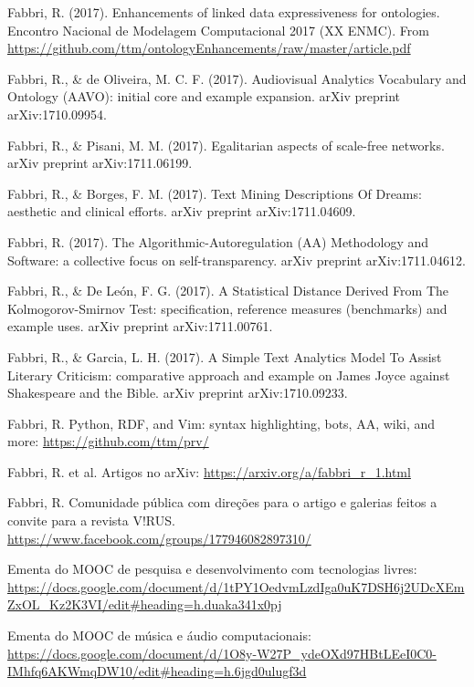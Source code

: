 \documentclass[a4paper, 11pt]{article}
\begin{document}
\begin{thebibliography}{99}
\fontsize{11}{0}\selectfont
{}
	Fabbri, R. (2017). Enhancements of linked data expressiveness for ontologies.
		Encontro Nacional de Modelagem Computacional 2017 (XX ENMC).
		From \url{https://github.com/ttm/ontologyEnhancements/raw/master/article.pdf}

	Fabbri, R., \& de Oliveira, M. C. F. (2017). Audiovisual Analytics Vocabulary and Ontology (AAVO): initial core and example expansion. arXiv preprint arXiv:1710.09954.

        Fabbri, R., \& Pisani, M. M. (2017). Egalitarian aspects of scale-free networks. arXiv preprint arXiv:1711.06199.

  Fabbri, R., \& Borges, F. M. (2017). Text Mining Descriptions Of Dreams: aesthetic and clinical efforts. arXiv preprint arXiv:1711.04609.

  Fabbri, R. (2017). The Algorithmic-Autoregulation (AA) Methodology and Software: a collective focus on self-transparency. arXiv preprint arXiv:1711.04612.
  
  Fabbri, R., \& De León, F. G. (2017). A Statistical Distance Derived From The Kolmogorov-Smirnov Test: specification, reference measures (benchmarks) and example uses. arXiv preprint arXiv:1711.00761.

  Fabbri, R., \& Garcia, L. H. (2017). A Simple Text Analytics Model To Assist Literary Criticism: comparative approach and example on James Joyce against Shakespeare and the Bible. arXiv preprint arXiv:1710.09233.

  Fabbri, R. Python, RDF, and Vim: syntax highlighting, bots, AA, wiki, and more: \url{https://github.com/ttm/prv/}

  Fabbri, R. et al. Artigos no arXiv: \url{https://arxiv.org/a/fabbri_r_1.html}

  Fabbri, R. Comunidade pública com direções para o artigo e galerias feitos a convite para a revista V!RUS.  \url{https://www.facebook.com/groups/177946082897310/}

  Ementa do MOOC de pesquisa e desenvolvimento com tecnologias livres: \url{https://docs.google.com/document/d/1tPY1OedvmLzdIga0uK7DSH6j2UDcXEmZxOL_Kz2K3VI/edit#heading=h.duaka341x0pj}

  Ementa do MOOC de música e áudio computacionais: \url{https://docs.google.com/document/d/1O8y-W27P_ydeOXd97HBtLEeI0C0-IMhfq6AKWmqDW10/edit#heading=h.6jgd0ulugf3d}


\end{thebibliography}
\end{document}
